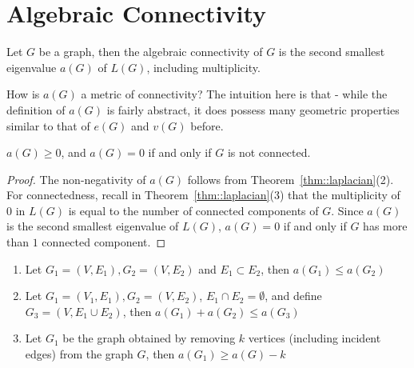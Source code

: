 \documentclass{article}
\begin{document}
\section{Algebraic Connectivity}

\begin{definition}
    Let $G$ be a graph, then the algebraic connectivity of $G$ is the second smallest eigenvalue $a(G)$ of $L(G)$, including multiplicity.
\end{definition}


How is $a(G)$ a metric of connectivity? The intuition here is that - while the definition of $a(G)$ is fairly abstract, it does possess many geometric properties similar to that of $e(G)$ and $v(G)$ before.

\begin{proposition}\label{prop::alg_comp}
    $a(G) \geq 0$, and $a(G) = 0$ if and only if $G$ is not connected.
\end{proposition}

\begin{proof}
    The non-negativity of $a(G)$ follows from Theorem~\ref{thm::laplacian}(2). For connectedness, recall in Theorem~\ref{thm::laplacian}(3) that the multiplicity of $0$ in $L(G)$ is equal to the number of connected components of $G$. Since $a(G)$ is the second smallest eigenvalue of $L(G)$, $a(G) = 0$ if and only if $G$ has more than $1$ connected component.
\end{proof}

\begin{theorem}\label{thm::a_facts}
    \begin{enumerate}
        \item Let $G_1 = (V, E_1), G_2 = (V, E_2)$ and $E_1 \subset E_2$, then $a(G_1) \leq a(G_2)$
        \item Let $G_1 = (V_1, E_1), G_2 = (V, E_2)$, $E_1 \cap E_2 = \emptyset$, and define $G_3 = (V, E_1 \cup E_2)$, then $a(G_1) + a(G_2) \leq a(G_3)$
        \item Let $G_1$ be the graph obtained by removing $k$ vertices (including incident edges) from the graph $G$, then $a(G_1) \geq a(G) - k$
    \end{enumerate}
\end{theorem}
\end{document}

